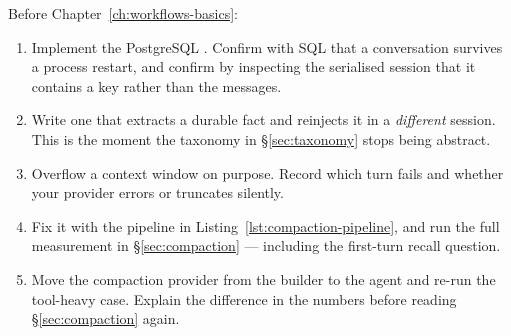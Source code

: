 \begin{exercisebox}
Before Chapter~\ref{ch:workflows-basics}:

\begin{enumerate}[leftmargin=1.4em]
\item Implement the PostgreSQL . Confirm with SQL that a
      conversation survives a process restart, and confirm by inspecting the
      serialised session that it contains a key rather than the messages.
\item Write one  that extracts a durable fact and
      reinjects it in a \emph{different} session. This is the moment the taxonomy
      in \S\ref{sec:taxonomy} stops being abstract.
\item Overflow a context window on purpose. Record which turn fails and whether
      your provider errors or truncates silently.
\item Fix it with the pipeline in Listing~\ref{lst:compaction-pipeline}, and run
      the full measurement in \S\ref{sec:compaction} --- including the first-turn
      recall question.
\item Move the compaction provider from the builder to the agent and re-run the
      tool-heavy case. Explain the difference in the numbers before reading
      \S\ref{sec:compaction} again.
\end{enumerate}
\end{exercisebox}
